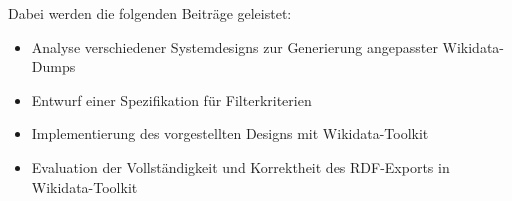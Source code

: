 Dabei werden die folgenden Beiträge geleistet:
\begin{itemize}
  \item Analyse verschiedener Systemdesigns zur Generierung angepasster Wikidata-Dumps
  \item Entwurf einer Spezifikation für Filterkriterien
  \item Implementierung des vorgestellten Designs mit Wikidata-Toolkit
  \item Evaluation der Vollständigkeit und Korrektheit des RDF-Exports in Wikidata-Toolkit
\end{itemize}